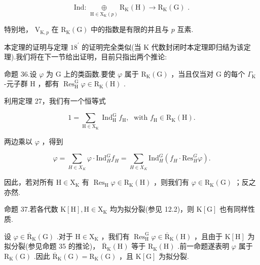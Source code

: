 \documentclass[10pt]{article}
\begin{document}
\[
\text{ Ind: }\underset{\mathrm{H} \in  {\mathrm{X}}_{\mathrm{K}}\left( p\right) }{ \oplus  }{\mathrm{R}}_{\mathrm{K}}\left( \mathrm{H}\right)  \rightarrow  {\mathrm{R}}_{\mathrm{K}}\left( \mathrm{G}\right) \text{ . }
\]

特别地， \({\mathrm{V}}_{\mathrm{K},p}\) 在 \({\mathrm{R}}_{\mathrm{K}}\left( \mathrm{G}\right)\) 中的指数是有限的并且与 \(p\) 互素.

本定理的证明与定理 \({18}^{\prime }\) 的证明完全类似(当 \(\mathrm{K}\) 代数封闭时本定理即归结为该定理).我们将在下一节给出证明，目前只指出两个推论:

命题 36.设 \(\varphi\) 为 G 上的类函数.要使 \(\varphi\) 属于 \({\mathrm{R}}_{\mathrm{K}}\left( \mathrm{G}\right)\) ，当且仅当对 \(\mathrm{G}\) 的每个 \({\Gamma }_{\mathrm{K}}\) -元子群 \(\mathrm{H}\) ，都有 \({\operatorname{Res}}_{\mathrm{H}}^{\mathrm{G}}\varphi  \in  {\mathrm{R}}_{\mathrm{K}}\left( \mathrm{H}\right)\) .

利用定理 27，我们有一个恒等式

\[
1 = \mathop{\sum }\limits_{{\mathrm{H} \in  {\mathrm{X}}_{\mathrm{K}}}}{\operatorname{Ind}}_{\mathrm{H}}^{\mathrm{G}}{f}_{\mathrm{H}},\;\text{ with }{f}_{\mathrm{H}} \in  {\mathrm{R}}_{\mathrm{K}}\left( \mathrm{H}\right) .
\]

两边乘以 \(\varphi\) ，得到

\[
\varphi  = \mathop{\sum }\limits_{{H \in  {X}_{K}}}\varphi  \cdot  {\mathrm{{Ind}}}_{H}^{G}{f}_{H} = \mathop{\sum }\limits_{{H \in  {X}_{K}}}{\mathrm{{Ind}}}_{H}^{G}\left( {{f}_{H} \cdot  {\mathrm{{Res}}}_{H}^{G}\varphi }\right) .
\]

因此，若对所有 \(\mathrm{H} \in  {\mathrm{X}}_{\mathrm{K}}\) 有 \({\operatorname{Res}}_{\mathrm{H}}\varphi  \in  {\mathrm{R}}_{\mathrm{K}}\left( \mathrm{H}\right)\) ，则我们有 \(\varphi  \in  {\mathrm{R}}_{\mathrm{K}}\left( \mathrm{G}\right)\) ；反之亦然.

命题 37.若各代数 \(\mathrm{K}\left\lbrack  \mathrm{H}\right\rbrack  ,\mathrm{H} \in  {\mathrm{X}}_{\mathrm{K}}\) 均为拟分裂(参见 12.2)，则 \(\mathrm{K}\left\lbrack  \mathrm{G}\right\rbrack\) 也有同样性质.

设 \(\varphi  \in  {\overline{\mathrm{R}}}_{\mathrm{K}}\left( \mathrm{G}\right)\) .对于 \(\mathrm{H} \in  {\mathrm{X}}_{\mathrm{K}}\) ，我们有 \({\operatorname{Res}}_{\mathrm{H}}^{\mathrm{G}}\varphi  \in  {\overline{\mathrm{R}}}_{\mathrm{K}}\left( \mathrm{H}\right)\) ，且由于 \(\mathrm{K}\left\lbrack  \mathrm{H}\right\rbrack\) 为拟分裂(参见命题 35 的推论)， \({\overline{\mathrm{R}}}_{\mathrm{K}}\left( \mathrm{H}\right)\) 等于 \({\mathrm{R}}_{\mathrm{K}}\left( \mathrm{H}\right)\) .前一命题遂表明 \(\varphi\) 属于 \({\mathrm{R}}_{\mathrm{K}}\left( \mathrm{G}\right)\) .因此 \({\overline{\mathrm{R}}}_{\mathrm{K}}\left( \mathrm{G}\right)  = {\mathrm{R}}_{\mathrm{K}}\left( \mathrm{G}\right)\) ，且 \(\mathrm{K}\left\lbrack  \mathrm{G}\right\rbrack\) 为拟分裂.
\end{document}
